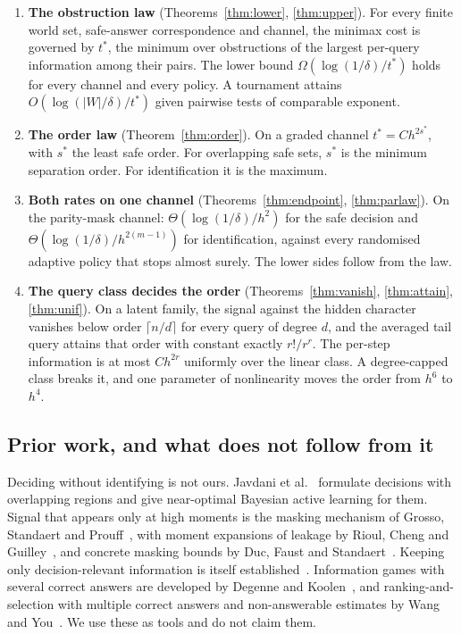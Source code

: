 \begin{enumerate}
\item[1)] \textbf{The obstruction law} (Theorems~\ref{thm:lower}, \ref{thm:upper}). For every
finite world set, safe-answer correspondence and channel, the minimax cost is governed by
$t^{*}$, the minimum over obstructions of the largest per-query information among their pairs.
The lower bound $\Omega(\log(1/\delta)/t^{*})$ holds for every channel and every policy. A
tournament attains $O(\log(|W|/\delta)/t^{*})$ given pairwise tests of comparable exponent.
\item[2)] \textbf{The order law} (Theorem~\ref{thm:order}). On a graded channel $t^{*}=Ch^{2s^{*}}$,
with $s^{*}$ the least safe order. For overlapping safe sets, $s^{*}$ is the minimum
separation order. For identification it is the maximum.
\item[3)] \textbf{Both rates on one channel} (Theorems~\ref{thm:endpoint},
\ref{thm:parlaw}). On the parity-mask channel: $\Theta(\log(1/\delta)/h^{2})$ for the safe
decision and $\Theta(\log(1/\delta)/h^{2(m-1)})$ for identification, against every randomised
adaptive policy that stops almost surely. The lower sides follow from the law.
\item[4)] \textbf{The query class decides the order} (Theorems~\ref{thm:vanish},
\ref{thm:attain}, \ref{thm:unif}). On a latent family, the signal against the hidden character
vanishes below order $\lceil n/d\rceil$ for every query of degree $d$, and the averaged tail
query attains that order with constant exactly $r!/r^{r}$. The per-step information is at most
$Ch^{2r}$ uniformly over the linear class. A degree-capped class breaks it, and one parameter
of nonlinearity moves the order from $h^{6}$ to $h^{4}$.
\end{enumerate}

\subsection{Prior work, and what does not follow from it}

Deciding without identifying is not ours. Javdani et al.~\cite{javdani2014} formulate decisions
with overlapping regions and give near-optimal Bayesian active learning for them. Signal that
appears only at high moments is the masking mechanism of Grosso, Standaert and
Prouff~\cite{grosso2014}, with moment expansions of leakage by Rioul, Cheng and
Guilley~\cite{rioul2021}, and concrete masking bounds by Duc, Faust and Standaert~\cite{duc2015}.
Keeping only decision-relevant information is itself established~\cite{poli2023}. Information
games with several correct answers are developed by Degenne and Koolen~\cite{degenne2019}, and
ranking-and-selection with multiple correct answers and non-answerable estimates by Wang and
You~\cite{wangyou2026}. We use these as tools and do not claim them.

